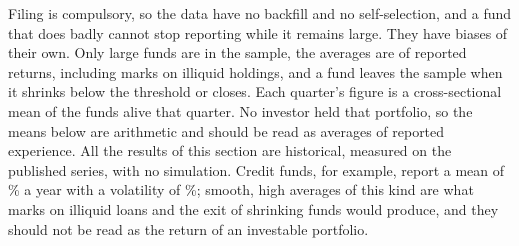 \begin{chapterrefs}
Filing is compulsory, so the data have no backfill and no self-selection, and a fund that does badly
cannot stop reporting while it remains large. They have biases of their own. Only large funds are in the
sample, the averages are of reported returns, including marks on illiquid holdings, and a fund leaves
the sample when it shrinks below the threshold or closes. Each quarter's figure is a cross-sectional
mean of the funds alive that quarter. No investor held that portfolio, so the means below are
arithmetic and should be read as averages of reported experience. All the results of this section are
historical, measured on the published series, with no simulation. Credit funds, for example, report a mean of
\hdMeanCredit\% a year with a volatility of \hdVolCredit\%; smooth, high averages of this kind are what
marks on illiquid loans and the exit of shrinking funds would produce, and they should not be read as
the return of an investable portfolio.


\end{chapterrefs}
